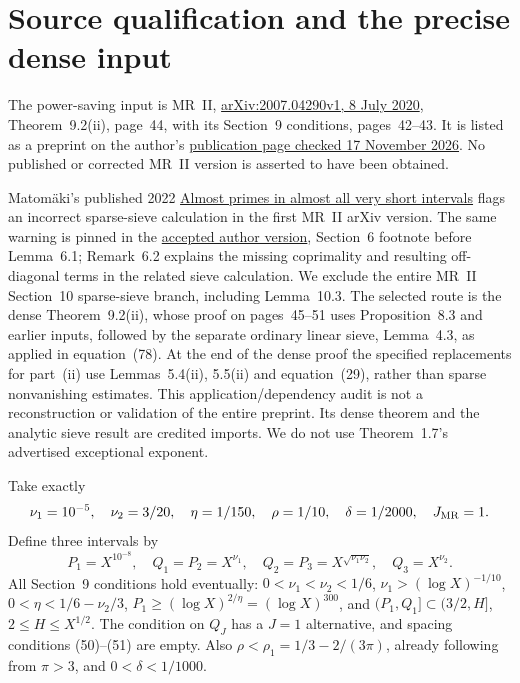 \documentclass[11pt]{article}
\begin{document}
\section{Source qualification and the precise dense input}
The power-saving input is MR~II,
\href{sources/mr-ii-2007.04290v1.pdf}{arXiv:2007.04290v1, 8 July 2020},
Theorem~9.2(ii), page~44, with its Section~9 conditions, pages~42--43.
It is listed as a preprint on the author's
\href{sources/matomaki-publications-20261117.html}{publication page checked 17 November 2026}.
No published or corrected MR~II version is asserted to have been obtained.

Matom\"aki's published 2022
\href{https://doi.org/10.1112/jlms.12592}{Almost primes in almost all very short intervals}
flags an incorrect sparse-sieve calculation in the first MR~II arXiv version.
The same warning is pinned in the
\href{sources/matomaki-2022-almost-primes-accepted-v3.pdf}{accepted author version},
Section~6 footnote before Lemma~6.1; Remark~6.2 explains the missing
coprimality and resulting off-diagonal terms in the related sieve calculation.
We exclude the entire MR~II Section~10 sparse-sieve branch, including
Lemma~10.3. The selected route is the dense Theorem~9.2(ii), whose proof
on pages~45--51 uses Proposition~8.3 and earlier inputs, followed by the
separate ordinary linear sieve, Lemma~4.3, as applied in equation~(78).
At the end of the dense proof the specified replacements for part~(ii)
use Lemmas~5.4(ii), 5.5(ii) and equation~(29), rather than sparse
nonvanishing estimates. This application/dependency audit is not a
reconstruction or validation of the entire preprint. Its dense theorem
and the analytic sieve result are credited imports.
We do not use Theorem~1.7's advertised exceptional exponent.

Take exactly
\[
 \nu_1=10^{-5},\quad\nu_2=3/20,\quad\eta=1/150,
 \quad\rho=1/10,\quad\delta=1/2000,\quad J_{\rm MR}=1.
\]
Define three intervals by
\[
 P_1=X^{10^{-8}},\quad Q_1=P_2=X^{\nu_1},\quad
 Q_2=P_3=X^{\sqrt{\nu_1\nu_2}},\quad Q_3=X^{\nu_2}.
\]
All Section~9 conditions hold eventually:
$0<\nu_1<\nu_2<1/6$, $\nu_1>(\log X)^{-1/10}$,
$0<\eta<1/6-\nu_2/3$, $P_1\ge(\log X)^{2/\eta}=(\log X)^{300}$,
and $(P_1,Q_1]\subset(3/2,H]$, $2\le H\le X^{1/2}$.
The condition on $Q_J$ has a $J=1$ alternative, and spacing conditions
(50)--(51) are empty. Also
$\rho<\rho_1=1/3-2/(3\pi)$, already following from $\pi>3$, and
$0<\delta<1/1000$.
\end{document}
